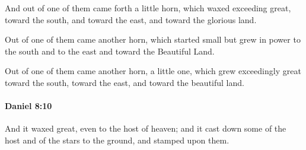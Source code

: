 			\begin{versebox}
					\item[BHS] 
					\item[LXX] 
					\item[ASV] And out of one of them came forth a little horn, which waxed exceeding great, toward the south, and toward the east, and toward the glorious land.
					\item[NIV] Out of one of them came another horn, which started small but grew in power to the south and to the east and toward the Beautiful Land.
					\item[NRSV] Out of one of them came another horn, a little one, which grew exceedingly great toward the south, toward the east, and toward the beautiful land.
			\end{versebox}

		\paragraph{Daniel 8:10} %
			\label{DANIEL-8-10}

			And it waxed great, even to the host of heaven; and it cast down some of the host and of the stars to the ground, and stamped upon them.

